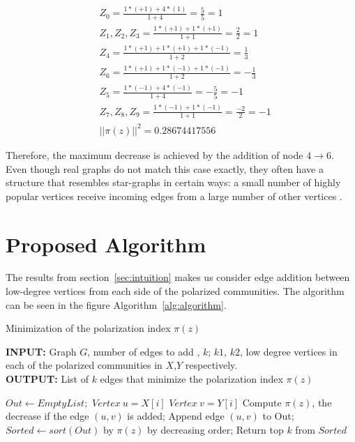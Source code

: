 \begin{equation}
	\begin{aligned}
		&Z_0 = \frac{1*(+1) + 4*(1)}{1 + 4} = \frac{5}{5} = 1\\
		&Z_1,Z_2,Z_3 = \frac{1*(+1) + 1*(+1)}{1 + 1} = \frac{2}{2} = 1\\
		&Z_4 = \frac{1*(+1)+1*(+1) + 1*(-1)}{1 + 2} = \frac{1}{3} \\
		&Z_6 = \frac{1*(+1) + 1*(-1)+ 1*(-1)}{1 + 2} = -\frac{1}{3}\\
		&Z_5 = \frac{1*(-1) + 4*(-1)}{1 + 4} = -\frac{5}{5} = -1\\
		&Z_7,Z_8,Z_9 = \frac{1*(-1) + 1*(-1)}{1 + 1} = \frac{-2}{2} = -1\\
		&||\pi(z)||^2 = 0.28674417556
	\end{aligned}
\end{equation}

Therefore, the maximum decrease is achieved by the addition of node $4\rightarrow6$. Even though real graphs do not match this case exactly, they often have a structure that resembles star-graphs in certain ways: a small number of highly popular vertices receive incoming edges from a large number of other vertices \cite{garimella}.

\section{Proposed Algorithm}
\label{sec:proposedAlgorithm}

The results from section~\ref{sec:intuition} makes us consider edge addition between low-degree vertices from each side of the polarized communities. The algorithm can be seen in the figure Algorithm~\ref{alg:algorithm}.

\begin{algorithm}[t]
	\caption{Minimization of the polarization index $\pi(z)$}
	\label{alg:algorithm}
	\begin{flushleft}
        		\textbf{INPUT:} Graph $G$, number of edges to add , $k$; $k1$, $k2$, low degree vertices in each of the polarized communities in $X$,$Y$ respectively.\\
        		\textbf{OUTPUT:} List of $k$ edges that minimize the polarization index $\pi(z)$
	\end{flushleft}
	\begin{algorithmic}[1]
		\STATE $Out \leftarrow Empty List;$
		\STATE $Vertex \ u = X[i]$
		\STATE $Vertex \ v = Y[i]$
		\STATE Compute $\pi(z)$, the decrease if the edge $(u,v)$ is added;
		\STATE Append edge $(u,v)$ to Out;
		\ENDFOR
		\ENDFOR
		\STATE $Sorted \leftarrow sort(Out)$ by $\pi(z)$ by decreasing order;
		\STATE Return top $k$ from $Sorted$
	\end{algorithmic}
\end{algorithm}


